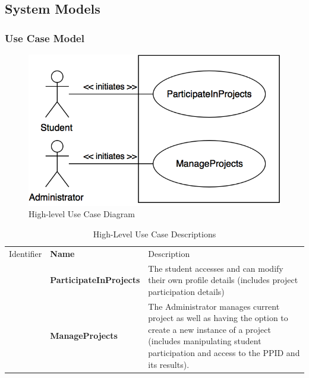 \documentclass[12pt,letterpaper]{article}
\begin{document}
\subsection{System Models}

\subsubsection{Use Case Model}



\begin{figure}[H]
	\centering{}
	\includegraphics[scale=0.3]{imgs/high-level-use-case-diagram.png}
	\caption{High-level Use Case Diagram}
\end{figure}

\begin{table}[H]
	\caption{High-Level Use Case Descriptions}
	\vspace{1em}
	\begin{tabu} to 
	    \tableheader{}Identifier & Name & Description\\
		\participateinprojects{} & ParticipateInProjects & The student accesses and can modify their own profile details 
		(includes project participation details)\\
		\manageprojects{} & ManageProjects & The Administrator manages current project as well as having the option to 
		create a new instance of a project (includes manipulating student participation and access to the PPID and its results). \\
	\end{tabu}
\end{table}
\end{document}

